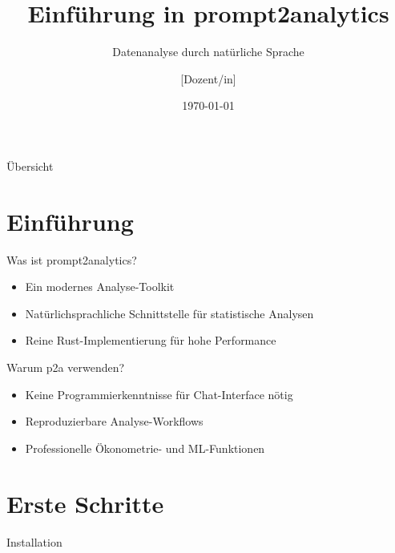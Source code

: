 \documentclass[aspectratio=169]{beamer}
\title{Einführung in prompt2analytics}
\subtitle{Datenanalyse durch natürliche Sprache}
\author{[Dozent/in]}
\institute{[Institution]}
\date{\today}
\begin{document}
\maketitle

\begin{frame}{Übersicht}
    \tableofcontents
\end{frame}

\section{Einführung}

\begin{frame}{Was ist prompt2analytics?}
    \begin{itemize}
        \item Ein modernes Analyse-Toolkit
        \item Natürlichsprachliche Schnittstelle für statistische Analysen
        \item Reine Rust-Implementierung für hohe Performance
    \end{itemize}
\end{frame}

\begin{frame}{Warum p2a verwenden?}
    \begin{itemize}
        \item Keine Programmierkenntnisse für Chat-Interface nötig
        \item Reproduzierbare Analyse-Workflows
        \item Professionelle Ökonometrie- und ML-Funktionen
    \end{itemize}
\end{frame}

\section{Erste Schritte}

\begin{frame}{Installation}
\end{frame}
\end{document}
